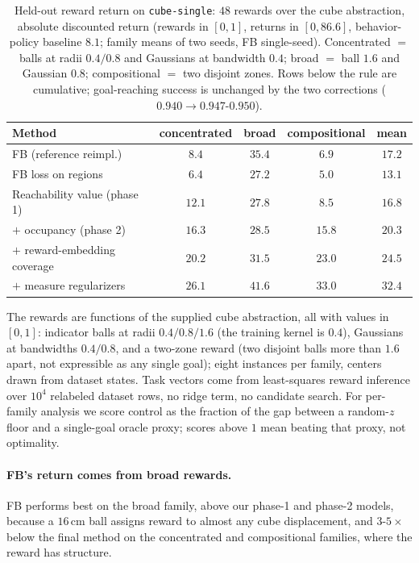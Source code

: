\documentclass{article}
\begin{document}
\begin{table}[t]
\centering\small
\begin{tabular}{l cccc}
\toprule
Method & concentrated & broad & compositional & mean \\
\midrule
FB (reference reimpl.)  & $8.4$ & $35.4$ & $6.9$ & $17.2$ \\
FB loss on regions      & $6.4$ & $27.2$ & $5.0$ & $13.1$ \\
\midrule
Reachability value (phase 1) & $12.1$ & $27.8$ & $8.5$  & $16.8$ \\
$+$ occupancy (phase 2)      & $16.3$ & $28.5$ & $15.8$ & $20.3$ \\
$+$ reward-embedding coverage & $20.2$ & $31.5$ & $23.0$ & $24.5$ \\
$+$ measure regularizers & $\mathbf{26.1}$ & $\mathbf{41.6}$ & $\mathbf{33.0}$ & $\mathbf{32.4}$ \\
\bottomrule
\end{tabular}
\caption{Held-out reward return on \texttt{cube-single}: $48$ rewards over the cube abstraction, absolute discounted return (rewards in $[0,1]$, returns in $[0,86.6]$, behavior-policy baseline $8.1$; family means of two seeds, FB single-seed).
Concentrated $=$ balls at radii $0.4/0.8$ and Gaussians at bandwidth $0.4$; broad $=$ ball $1.6$ and Gaussian $0.8$; compositional $=$ two disjoint zones.
Rows below the rule are cumulative; goal-reaching success is unchanged by the two corrections ($0.940\to0.947$-$0.950$).}
\label{tab:transfer}
\end{table}

The rewards are functions of the supplied cube abstraction, all with values in $[0,1]$: indicator balls at radii $0.4/0.8/1.6$ (the training kernel is $0.4$), Gaussians at bandwidths $0.4/0.8$, and a two-zone reward (two disjoint balls more than $1.6$ apart, not expressible as any single goal); eight instances per family, centers drawn from dataset states.
Task vectors come from least-squares reward inference over $10^4$ relabeled dataset rows, no ridge term, no candidate search.
For per-family analysis we score control as the fraction of the gap between a random-$z$ floor and a single-goal oracle proxy; scores above $1$ mean beating that proxy, not optimality.

\paragraph{FB's return comes from broad rewards.}
FB performs best on the broad family, above our phase-1 and phase-2 models, because a $16$\,cm ball assigns reward to almost any cube displacement, and $3$-$5\times$ below the final method on the concentrated and compositional families, where the reward has structure.
\end{document}
